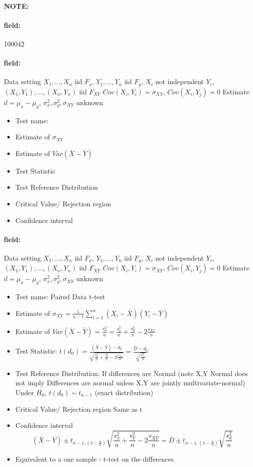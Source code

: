 \documentclass[12pt]{article}
\newenvironment{note}{\paragraph{NOTE:}}{}
\newenvironment{field}{\paragraph{field:}}{}
\begin{document}
\begin{note} \begin{field} \tiny 100042 \end{field}
 \begin{field}
  Data setting $X_1, \ldots , X_n$ iid $F_x$, $Y_1, \ldots, Y_n$ iid $F_y$, $X_i$ not independent $Y_i$, $(X_1, Y_1), \ldots , (X_n,Y_n)$ iid $F_{XY}$ $Cov(X_i,Y_i) = \sigma_{XY}$, $Cov(X_i,Y_j) = 0$ Estimate $d = \mu_x - \mu_y$, $\sigma_x^2, \sigma_y^2, \sigma_{XY}$ unknown
  \begin{itemize}
   \item Test name:
   \item Estimate of $\sigma_{XY}$
   \item Estimate of $Var(\bar{X} - \bar{Y})$
   \item Test Statistic
   \item Test Reference Distribution
   \item Critical Value/ Rejection region
   \item Confidence interval
  \end{itemize}
 \end{field}
 \begin{field}
  Data setting $X_1, \ldots , X_n$ iid $F_x$, $Y_1, \ldots, Y_n$ iid $F_y$, $X_i$ not independent $Y_i$, $(X_1, Y_1), \ldots , (X_n,Y_n)$ iid $F_{XY}$ $Cov(X_i,Y_i) = \sigma_{XY}$, $Cov(X_i,Y_j) = 0$ Estimate $d = \mu_x - \mu_y$, $\sigma_x^2, \sigma_y^2, \sigma_{XY}$ unknown
  \begin{itemize}
   \item Test name: Paired Data t-test
   \item Estimate of $\sigma_{XY} = \frac{1}{n-1} \sum_{i=1}^n (X_i - \bar{X})(Y_i - \bar{Y})$
   \item Estimate of $Var(\bar{X} - \bar{Y}) = \frac{s_d^2}{n} = \frac{s_x^2}{n} + \frac{s_Y^2}{n} - 2 \frac{s_{XY}}{n}$
   \item Test Statistic: $t(d_0) = \frac{(\bar{X} - \bar{Y}) - d_0}{\sqrt{\frac{s_x^2}{n} + \frac{s_Y^2}{n} - 2 \frac{s_{XY}}{n}}} = \frac{\bar{D} - d_0}{\sqrt{\frac{s_D^2}{n}}}$
   \item Test Reference Distribution: If differences are Normal (note X,Y Normal does not imply Differences are normal unless X,Y are jointly multivariate-normal) Under $H_0$, $t(d_0) \sim t_{n-1}$ (exact distribution)
   \item Critical Value/ Rejection region Same as t
   \item Confidence interval
         $$ (\bar{X} - \bar{Y}) \pm t_{n-1,(1 - \frac{\alpha}{2})}\sqrt{\frac{s_x^2}{n} + \frac{s_Y^2}{n} - 2 \frac{s_{XY}}{n}} = \bar{D} \pm  t_{n-1,(1 - \frac{\alpha}{2})} \sqrt{\frac{s_d^2}{n}}$$
   \item Equivalent to a one sample - t-test on the differences
  \end{itemize}
 \end{field}
\end{note}
\end{document}
